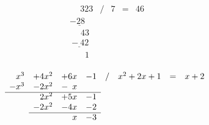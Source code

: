 \[
  \begin{array}{lcccc}
      \phantom{-}323 & / & 7 & = & 46\\
      \underline{-28\phantom{3}} & & & & \\
      \phantom{-3}43 & & & & \\
     \underline{\phantom{}-42} & & & & \\
     \phantom{-34}1 & & & & \\
  \end{array}
\]

\[
  \begin{array}{llllllcccc}
    \phantom{-}x^3 & +4x^2 & +6x & -1 & / & x^2+2x+1 & = & x + 2 \\
    -x^3 & - 2x^2 & -\phantom{6}x \\\cline{1-4}
                   & \phantom{-}2x^2 & +5x & -1\\
                   & - 2x^2 & -4x & -2\\\cline{2-4}
                   & & \phantom{-4}x & -3
  \end{array}
\]

